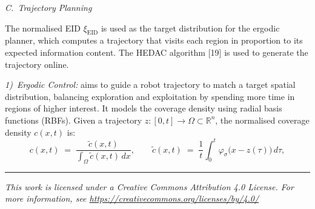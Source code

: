 \documentclass[11pt]{article}
\begin{document}
\noindent\textit{C.~Trajectory Planning}

\vspace{0.2em}

\noindent
The normalised EID $\xi_{\mathrm{EID}}$ is used as the target
distribution for the ergodic planner, which computes a trajectory
that visits each region in proportion to its expected information
content. The HEDAC algorithm [19] is used to generate the trajectory
online.

\vspace{0.3em}

\noindent\textit{\hspace{1em}1)~Ergodic Control:} aims to guide a
robot trajectory to match a target spatial distribution, balancing
exploration and exploitation by spending more time in regions of
higher interest. It models the coverage density using radial basis
functions (RBFs). Given a trajectory
$z : [0,t] \to \Omega \subset \mathbb{R}^{n}$, the normalised
coverage density $c(x,t)$ is:
\[
c(x,t) \;=\; \frac{\tilde{c}(x,t)}{\int_{\Omega} \tilde{c}(x,t)\,dx},
\qquad
\tilde{c}(x,t) \;=\; \frac{1}{t}\int_{0}^{t}
                     \varphi_{\sigma}\!\bigl(x - z(\tau)\bigr)\,d\tau,
\]

\vfill
\hrule
\vspace{0.3em}
\begin{center}
{\footnotesize\itshape
This work is licensed under a Creative Commons Attribution 4.0
License. For more information, see
\url{https://creativecommons.org/licenses/by/4.0/}\par}
\end{center}
\end{document}
